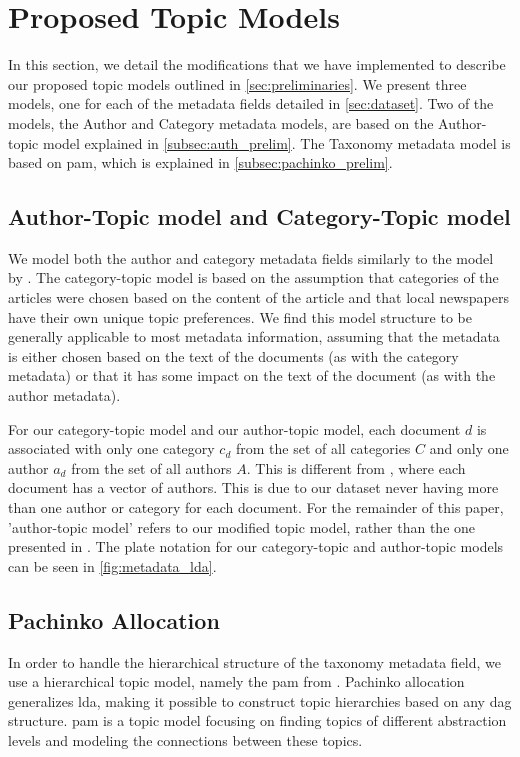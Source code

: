 \section{Proposed Topic Models}\label{sec:plate_notation}
In this section, we detail the modifications that we have implemented to describe our proposed topic models outlined in \autoref{sec:preliminaries}.
We present three models, one for each of the metadata fields detailed in \autoref{sec:dataset}.
Two of the models, the Author and Category metadata models, are based on the Author-topic model explained in \autoref{subsec:auth_prelim}.
The Taxonomy metadata model is based on \gls{pam}, which is explained in \autoref{subsec:pachinko_prelim}.

\subsection{Author-Topic model and Category-Topic model}
We model both the author and category metadata fields similarly to the model by \citet{author_topic_2012}.
The category-topic model is based on the assumption that categories of the articles were chosen based on the content of the article and that local newspapers have their own unique topic preferences.
We find this model structure to be generally applicable to most metadata information, assuming that the metadata is either chosen based on the text of the documents (as with the category metadata) or that it has some impact on the text of the document (as with the author metadata).

For our category-topic model and our author-topic model, each document $d$ is associated with only one category $c_d$ from the set of all categories $C$ and only one author $a_d$ from the set of all authors $A$.
This is different from \citet{author_topic_2012}, where each document has a vector of authors.
This is due to our dataset never having more than one author or category for each document.
For the remainder of this paper, 'author-topic model' refers to our modified topic model, rather than the one presented in \citet{author_topic_2012}.
The plate notation for our category-topic and author-topic models can be seen in \autoref{fig:metadata_lda}.

\subsection{Pachinko Allocation}\label{subsec:pam}
In order to handle the hierarchical structure of the taxonomy metadata field, we use a hierarchical topic model, namely the \acrfull{pam} from \citet{li2006pachinko}.
Pachinko allocation generalizes \gls{lda}, making it possible to construct topic hierarchies based on any \gls{dag} structure.
\gls{pam} is a topic model focusing on finding topics of different abstraction levels and modeling the connections between these topics.

